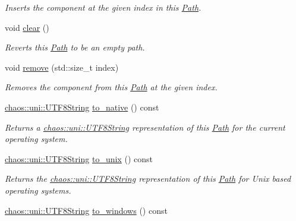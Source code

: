 \begin{DoxyCompactItemize}
\begin{DoxyCompactList}\small\item\em Inserts the component at the given index in this \hyperlink{classchaos_1_1io_1_1sys_1_1_path}{Path}. \end{DoxyCompactList}\item 
void \hyperlink{classchaos_1_1io_1_1sys_1_1_path_a7c4cd7e5d8e21a8c522f8a87f1e90f4c}{clear} ()
\begin{DoxyCompactList}\small\item\em Reverts this \hyperlink{classchaos_1_1io_1_1sys_1_1_path}{Path} to be an empty path. \end{DoxyCompactList}\item 
void \hyperlink{classchaos_1_1io_1_1sys_1_1_path_ae1f5ed612b5d85f99eb5dd436dd7b1ed}{remove} (std\-::size\-\_\-t index)
\begin{DoxyCompactList}\small\item\em Removes the component from this \hyperlink{classchaos_1_1io_1_1sys_1_1_path}{Path} at the given index. \end{DoxyCompactList}\item 
\hyperlink{classchaos_1_1uni_1_1_u_t_f8_string}{chaos\-::uni\-::\-U\-T\-F8\-String} \hyperlink{classchaos_1_1io_1_1sys_1_1_path_adb68b7589d18dc78f19d9dd6936d9833}{to\-\_\-native} () const 
\begin{DoxyCompactList}\small\item\em Returns a \hyperlink{classchaos_1_1uni_1_1_u_t_f8_string}{chaos\-::uni\-::\-U\-T\-F8\-String} representation of this \hyperlink{classchaos_1_1io_1_1sys_1_1_path}{Path} for the current operating system. \end{DoxyCompactList}\item 
\hyperlink{classchaos_1_1uni_1_1_u_t_f8_string}{chaos\-::uni\-::\-U\-T\-F8\-String} \hyperlink{classchaos_1_1io_1_1sys_1_1_path_a1cfe95a7a81ba7da856ae79917e6b1bf}{to\-\_\-unix} () const 
\begin{DoxyCompactList}\small\item\em Returns the \hyperlink{classchaos_1_1uni_1_1_u_t_f8_string}{chaos\-::uni\-::\-U\-T\-F8\-String} representation of this \hyperlink{classchaos_1_1io_1_1sys_1_1_path}{Path} for Unix based operating systems. \end{DoxyCompactList}\item 
\hyperlink{classchaos_1_1uni_1_1_u_t_f8_string}{chaos\-::uni\-::\-U\-T\-F8\-String} \hyperlink{classchaos_1_1io_1_1sys_1_1_path_ad7b185968a88741d52526a32738d0ab4}{to\-\_\-windows} () const 

\end{DoxyCompactItemize}
